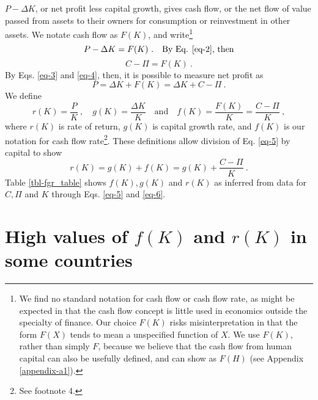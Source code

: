 $P-\Delta K$, or net profit less capital growth, gives cash flow, or the net flow of value passed from assets to their owners for consumption or reinvestment in other assets. We notate cash flow as $F(K)$, and write\footnote{We find no standard notation for cash flow or cash flow rate, as might be expected in that the cash flow concept is little used in economics outside the specialty of finance. Our choice $F(K)$ risks misinterpretation in that the form $F(X)$ tends to mean a unspecified function of $X$. We use $F(K)$, rather than simply $F$, because we believe that the cash flow from human capital can also be usefully defined, and can show as $F(H)$ (see Appendix \ref{appendix-a1}).}
\begin{equation}
    P - \Delta K = F(K) \ . \quad \text{By Eq. \eqref{eq-2}, then} \label{eq-3}
\end{equation}
\vspace{-5ex}
\begin{equation}
    C - \Pi = F(K) \label{eq-4} \ .
\end{equation}
%
By Eqs. \eqref{eq-3} and \eqref{eq-4}, then, it is possible to measure net profit as 
%
\begin{equation}
P = \Delta K + F(K) = \Delta K + C - \Pi\ . \label{eq-5}
\end{equation}
We define
\begin{equation*}
r(K) = \frac{P}{K}\ , \quad g(K) = \frac{\Delta K}{K} \quad \text{and} \quad f(K) = \frac{F(K)}{K} = \frac{C - \Pi}{K} \ ,
\end{equation*}
where $r(K)$ is rate of return, $g(K)$ is capital growth rate, and $f(K)$ is our notation for cash flow rate\footnote{See footnote 4.}. These definitions allow division of Eq. \eqref{eq-5} by capital to show
\begin{equation}
    r(K) = g(K) + f(K) = g(K) + \frac{C-\Pi}{K}\ . \label{eq-6}
\end{equation}
Table \ref{tbl-fgr_table} shows \(f(K), g(K)\) and \(r(K)\) as inferred from data for \(C,\Pi\) and \(K\) through Eqs. \eqref{eq-5} and \eqref{eq-6}.
%
\FloatBarrier

\FloatBarrier


\section{High values of \(f(K)\) and \(r(K)\) in some countries}

